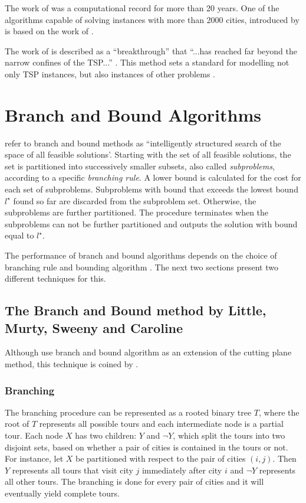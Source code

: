 \documentclass[a4paper,12pt]{article}
\begin{document}
The work of \citet{Dantzig54} was a computational record for more than 20 years. One of the algorithms capable of solving instances with more than 2000 cities, introduced by \citet{Padberg91} is based on the work of \citet{Dantzig54}.

The work of \citet{Dantzig54} is described as a ``breakthrough'' that ``...has reached far beyond the narrow confines of the TSP...'' \citep{Applegate07}. This method sets a standard for modelling not only TSP instances, but also instances of other problems \citep{Laporte86,Baker83,Agarwal89}.


\section{Branch and Bound Algorithms}
\label{sec:bandb}

\citet{Lawler66} refer to branch and bound methods as ``intelligently structured search of the space of all feasible solutions'. Starting with the set of all feasible solutions, the set is partitioned into successively smaller subsets, also called \textit{subproblems}, according to a specific \textit{branching rule}. A lower bound is calculated for the cost for each set of subproblems. Subproblems with bound that exceeds the lowest bound $l^{\star}$ found so far are discarded from the subproblem set. Otherwise, the subproblems are further partitioned. The procedure terminates when the subproblems can not be further partitioned and outputs the solution with bound equal to $l^{\star}$.

The performance of branch and bound algorithms depends on the choice of branching rule and bounding algorithm \citep{Christofides81,Lawler66}. The next two sections present two different techniques for this.

\subsection{The Branch and Bound method by Little, Murty, Sweeny and Caroline}
\label{subsec:little63}

Although \citet{Dantzig54} use branch and bound algorithm as an extension of the cutting plane method, this technique is coined by \citet{Little63}.

\subsubsection*{Branching}
The branching procedure can be represented as a rooted binary tree $T$, where the root of $T$ represents all possible tours and each intermediate node is a partial tour. Each node $X$ has two children: $Y$ and $\neg Y$, which split the tours into two disjoint sets, based on whether a pair of cities is contained in the tours or not. For instance, let $X$ be partitioned with respect to the pair of cities $(i,j)$. Then $Y$ represents all tours that visit city $j$ immediately after city $i$ and $\neg Y$ represents all other tours. The branching is done for every pair of cities and it will eventually yield complete tours.
\end{document}
